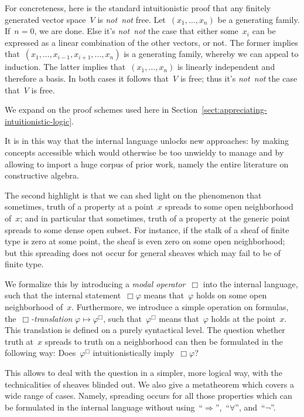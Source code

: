 \documentclass[10pt,reqno,a4paper]{amsbook}
\theoremstyle{definition}
\theoremstyle{plain}
\theoremstyle{remark}
\newcommand{\?}{\,{:}\,}
\renewcommand{\_}{\mathpunct{.}\,}
\newcommand{\notnot}{\emph{not~not}\xspace}
\begin{document}
{{For concreteness, here is the standard intuitionistic proof that any finitely
generated vector space~$V$ is \notnot free. Let~$(x_1,\ldots,x_n)$ be a
generating family. If~$n = 0$, we are done. Else it's \notnot the case that
either some~$x_i$ can be expressed as a linear combination of the other
vectors, or not. The former implies
that~$(x_1,\ldots,x_{i-1},x_{i+1},\ldots,x_n)$ is a generating family, whereby
we can appeal to induction. The latter implies that~$(x_1,\ldots,x_n)$ is
linearly independent and therefore a basis. In both cases it follows that~$V$
is free; thus it's \notnot the case that~$V$ is free.

We expand on the proof schemes used here in
Section~\ref{sect:appreciating-intuitionistic-logic}.}

It is in this way that the internal language unlocks new approaches: by
making concepts accessible which would otherwise be too unwieldy to manage and
by allowing to import a huge corpus of prior work, namely the entire literature
on constructive algebra.

The second highlight is that we can shed light on the phenomenon that
sometimes, truth of a property at a point~$x$ spreads to some open
neighborhood of~$x$; and in particular that sometimes, truth of a property at
the generic point spreads to some dense open subset. For instance, if the stalk
of a sheaf of finite type is zero at some point, the sheaf is even zero on some
open neighborhood; but this spreading does not occur for general sheaves which
may fail to be of finite type.

We formalize this by introducing a \emph{modal operator}~$\Box$ into the
internal language, such that the internal statement~$\Box\varphi$ means
that~$\varphi$ holds on some open neighborhood of~$x$. Furthermore, we
introduce a simple operation on formulas, the~\emph{$\Box$-translation}
$\varphi \mapsto \varphi^\Box$, such that~$\varphi^\Box$ means that~$\varphi$
holds at the point~$x$. This translation is defined on a purely syntactical
level. The question whether truth at~$x$ spreads to truth on a
neighborhood can then be formulated in the following way: Does~$\varphi^\Box$
intuitionistically imply~$\Box\varphi$?

This allows to deal with the question in a simpler, more logical way, with the
technicalities of sheaves blinded out. We also give a metatheorem which
covers a wide range of cases. Namely, spreading occurs for all those properties
which can be formulated in the internal language without
using~``$\Rightarrow$'',~``$\forall$'', and~``$\neg$''.

}
\end{document}
